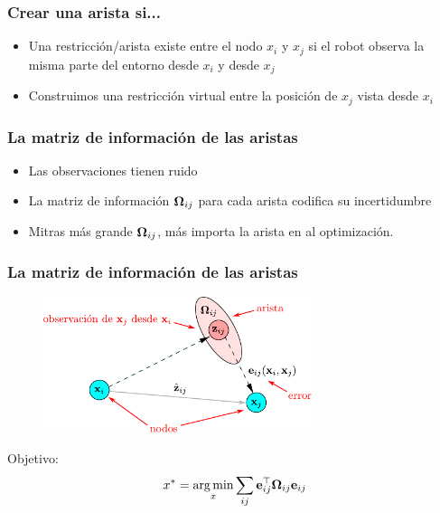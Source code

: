 \begin{frame}
	\frametitle{Crear una arista si...}
	
	\begin{itemize}
		\item<1-> Una restricción/arista existe entre el nodo $x_{i}$ y $x_{j}$ si el robot observa la misma parte del entorno desde $x_{i}$ y desde $x_{j}$
		\item<2>  Construimos una restricción virtual entre la posición de $x_{j}$ vista desde $x_{i}$
	\end{itemize}
	
\end{frame}


\begin{frame}
	\frametitle{La matriz de información de las aristas}
    \begin{itemize}
		\item Las observaciones tienen ruido
		\item La matriz de información $\boldsymbol{\mathbf{\Omega}}_{ij}$ para cada arista codifica su incertidumbre
		\item Mitras más grande $\boldsymbol{\mathbf{\Omega}}_{ij}$, más importa la arista en al optimización.
	\end{itemize}
	
\end{frame}

\begin{frame}
	\frametitle{La matriz de información de las aristas}
    \begin{figure}[!h]
		\includegraphics[width=0.7\textwidth]{images/factor_graph_edge_example.pdf}
	\end{figure}

	Objetivo:
	\begin{equation*}
		x^{*} = \operatorname*{arg\,min}_{x} \sum_{ij} \boldsymbol{\mathbf{e}}^{\top}_{ij} \boldsymbol{\mathbf{\Omega}}_{ij} \boldsymbol{\mathbf{e}}_{ij}
	\end{equation*}
	
\end{frame}



